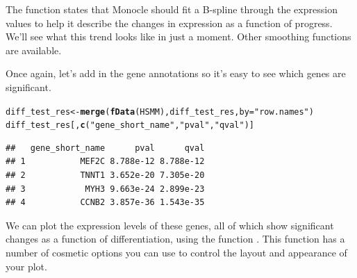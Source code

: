 \documentclass[10pt,oneside]{article}\usepackage[]{graphicx}\usepackage[]{color}
\makeatletter
\newcommand{\hlstr}[1]{\textcolor[rgb]{0.192,0.494,0.8}{#1}}%
\newcommand{\hlstd}[1]{\textcolor[rgb]{0.345,0.345,0.345}{#1}}%
\newcommand{\hlkwb}[1]{\textcolor[rgb]{0.69,0.353,0.396}{#1}}%
\newcommand{\hlkwc}[1]{\textcolor[rgb]{0.333,0.667,0.333}{#1}}%
\newcommand{\hlkwd}[1]{\textcolor[rgb]{0.737,0.353,0.396}{\textbf{#1}}}%
\newenvironment{kframe}{%
 \def\at@end@of@kframe{}%
 \ifinner\ifhmode%
  \def\at@end@of@kframe{\end{minipage}}%
  \begin{minipage}{\columnwidth}%
 \fi\fi%
 \def\FrameCommand##1{\hskip\@totalleftmargin \hskip-\fboxsep
 \colorbox{shadecolor}{##1}\hskip-\fboxsep
     \hskip-\linewidth \hskip-\@totalleftmargin \hskip\columnwidth}%
 \MakeFramed {\advance\hsize-\width
   \@totalleftmargin\z@ \linewidth\hsize
   \@setminipage}}%
 {\par\unskip\endMakeFramed%
 \at@end@of@kframe}
\newenvironment{knitrout}{}{} %
\makeatother
\begin{document}
The  function states that Monocle should fit a B-spline through the expression values to help it describe the changes in expression as a function of progress. We'll see what this trend looks like in just a moment. Other smoothing functions are available.

Once again, let's add in the gene annotations so it's easy to see which genes are significant.
\begin{knitrout}
\color{fgcolor}\begin{kframe}
\begin{alltt}
\hlstd{diff_test_res} \hlkwb{<-} \hlkwd{merge}\hlstd{(}\hlkwd{fData}\hlstd{(HSMM), diff_test_res,} \hlkwc{by} \hlstd{=} \hlstr{"row.names"}\hlstd{)}
\hlstd{diff_test_res[,} \hlkwd{c}\hlstd{(}\hlstr{"gene_short_name"}\hlstd{,} \hlstr{"pval"}\hlstd{,} \hlstr{"qval"}\hlstd{)]}
\end{alltt}
\begin{verbatim}
##   gene_short_name      pval      qval
## 1           MEF2C 8.788e-12 8.788e-12
## 2           TNNT1 3.652e-20 7.305e-20
## 3            MYH3 9.663e-24 2.899e-23
## 4           CCNB2 3.857e-36 1.543e-35
\end{verbatim}
\end{kframe}
\end{knitrout}


We can plot the expression levels of these genes, all of which show significant changes as a function of differentiation, using the function . This function has a number of cosmetic options you can use to control the layout and appearance of your plot.
\end{document}
